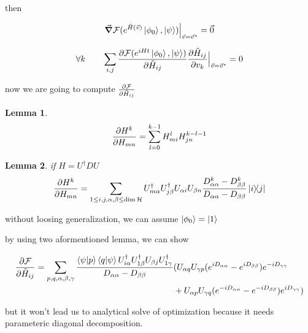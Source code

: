 \documentclass{article}
\begin{document}
then

\[\gradient \mathcal{F}(e^{\tilde{H}(\vec{v})} \ket{\phi_0}, \ket{\psi}) \Big|_{\vec{v} = \vec{v}^*} = \vec{0} \]

\[ \forall k \quad\quad \sum_{i,j} \pdv{\mathcal{F}(e^{iHt} \ket{\phi_0}, \ket{\psi})}{\tilde{H}_{ij}} \pdv{\tilde{H}_{ij}}{v_k}  \Big|_{\vec{v} = \vec{v}^*} = 0 \]

now we are going to compute $\pdv{\mathcal{F}}{\tilde{H}_{ij}}$

\newtheorem{lemma}{Lemma}
\begin{lemma}
\[ \pdv{H^k}{H_{mn}} = \sum_{l = 0}^{k-1} H^{l}_{mi} H^{k-l-1}_{jn} \]
\end{lemma}

\begin{lemma}
if
$H = U^\dagger D U$
\[ \pdv{H^k}{H_{mn}} = \sum_{1 \le i, j, \alpha,\beta \le \dim{\mathcal{H}}} U_{m\alpha}^\dagger U_{j\beta}^\dagger U_{\alpha i} U_{\beta n} \frac{D_{\alpha\alpha}^k - D_{\beta\beta}^k}{D_{\alpha\alpha} - D_{\beta\beta}} \dyad{i}{j} \] 
\end{lemma}

without loosing generalization, we can assume $\ket{\phi_0} = \ket{1}$

by using two aformentioned lemma, we can show

\[ \begin{split} 
  \pdv{\mathcal{F}}{\tilde{H}_{ij}} = \sum_{p,q,\alpha,\beta,\gamma} \frac{\braket{\psi}{p}\braket{q}{\psi}U^\dagger_{i \alpha} U^\dagger_{1 \beta} U_{\beta j} U^\dagger_{1 \gamma}}{D_{\alpha\alpha} - D_{\beta\beta}} & ( U_{\alpha q} U_{\gamma p}(e^{iD_{\alpha\alpha}} - e^{iD_{\beta\beta}}) e^{-iD_{\gamma\gamma}} \\
   & + U_{\alpha p} U_{\gamma q} (e^{-iD_{\alpha\alpha}} - e^{-iD_{\beta\beta}}) e^{iD_{\gamma\gamma}} )
 \end{split} \]
 
 but it won't lead us to analytical solve of optimization because it needs parameteric diagonal decomposition.
\end{document}
